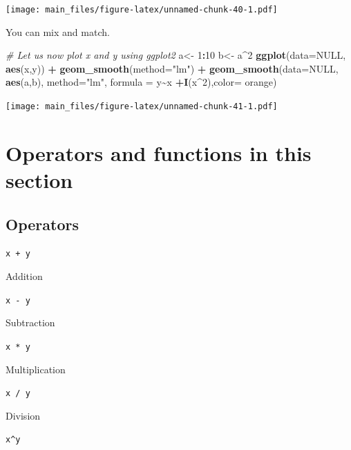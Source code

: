 \documentclass[
]{book}
\newenvironment{Shaded}{\begin{snugshade}}{\end{snugshade}}
\newcommand{\AttributeTok}[1]{\textcolor[rgb]{0.13,0.29,0.53}{#1}}
\newcommand{\CommentTok}[1]{\textcolor[rgb]{0.56,0.35,0.01}{\textit{#1}}}
\newcommand{\ConstantTok}[1]{\textcolor[rgb]{0.56,0.35,0.01}{#1}}
\newcommand{\DecValTok}[1]{\textcolor[rgb]{0.00,0.00,0.81}{#1}}
\newcommand{\FunctionTok}[1]{\textcolor[rgb]{0.13,0.29,0.53}{\textbf{#1}}}
\newcommand{\NormalTok}[1]{#1}
\newcommand{\OtherTok}[1]{\textcolor[rgb]{0.56,0.35,0.01}{#1}}
\newcommand{\SpecialCharTok}[1]{\textcolor[rgb]{0.81,0.36,0.00}{\textbf{#1}}}
\newcommand{\StringTok}[1]{\textcolor[rgb]{0.31,0.60,0.02}{#1}}
\begin{document}
\texttt{[image: main\_files/figure-latex/unnamed-chunk-40-1.pdf]}

You can mix and match.

\begin{Shaded}
\begin{Highlighting}[]
\CommentTok{\# Let us now plot x and y using ggplot2}
\NormalTok{a}\OtherTok{\textless{}{-}} \DecValTok{1}\SpecialCharTok{:}\DecValTok{10}
\NormalTok{b}\OtherTok{\textless{}{-}}\NormalTok{ a}\SpecialCharTok{\^{}}\DecValTok{2}
\FunctionTok{ggplot}\NormalTok{(}\AttributeTok{data=}\ConstantTok{NULL}\NormalTok{, }\FunctionTok{aes}\NormalTok{(x,y)) }\SpecialCharTok{+}
  \FunctionTok{geom\_smooth}\NormalTok{(}\AttributeTok{method=}\StringTok{"lm"}\NormalTok{) }\SpecialCharTok{+}
  \FunctionTok{geom\_smooth}\NormalTok{(}\AttributeTok{data=}\ConstantTok{NULL}\NormalTok{, }\FunctionTok{aes}\NormalTok{(a,b), }\AttributeTok{method=}\StringTok{"lm"}\NormalTok{, }\AttributeTok{formula =}\NormalTok{ y}\SpecialCharTok{\textasciitilde{}}\NormalTok{x }\SpecialCharTok{+}\FunctionTok{I}\NormalTok{(x}\SpecialCharTok{\^{}}\DecValTok{2}\NormalTok{),}\AttributeTok{color=} \StringTok{\textquotesingle{}orange\textquotesingle{}}\NormalTok{) }
\end{Highlighting}
\end{Shaded}

\texttt{[image: main\_files/figure-latex/unnamed-chunk-41-1.pdf]}

\hypertarget{operators-and-functions-in-this-section}{%
\section{Operators and functions in this section}\label{operators-and-functions-in-this-section}}

\hypertarget{operators-1}{%
\subsection{Operators}\label{operators-1}}

\texttt{x\ +\ y}

Addition

\texttt{x\ -\ y}

Subtraction

\texttt{x\ *\ y}

Multiplication

\texttt{x\ /\ y}

Division

\texttt{x\^{}y}
\end{document}
